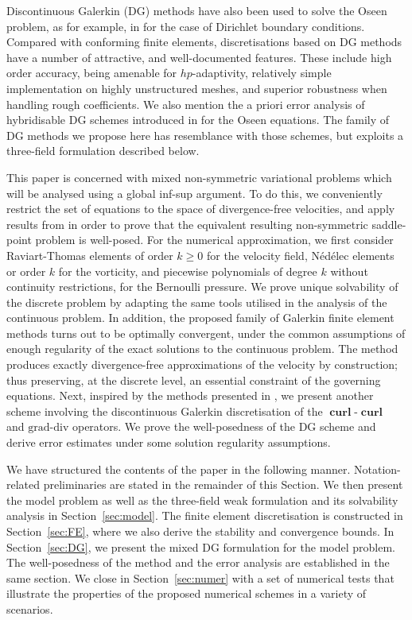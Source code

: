 \documentclass[reqno,a4paper]{article}
\numberwithin{equation}{section}
\newcommand\curl{\mathop{\mathbf{curl}}\nolimits}
\begin{document}
Discontinuous Galerkin (DG) methods have also been used to solve the Oseen problem,
as for example, in \cite{Cockburn03,Cockburn05}  for the case of Dirichlet boundary conditions. 
Compared with conforming finite elements, discretisations based on DG methods have a number of 
attractive, and well-documented features. These include  
 high order accuracy, being amenable for $hp$-adaptivity, relatively simple implementation on 
 highly unstructured meshes, and superior robustness when handling rough coefficients. 
We also mention the a priori error analysis of hybridisable DG schemes introduced  
in \cite{CockburnJSC13} for the Oseen equations. The family of DG methods we propose here 
has resemblance with those schemes, but exploits a three-field formulation described below. 


This paper is concerned with mixed non-symmetric variational problems 
which will be  analysed using a global inf-sup argument. 
To do this, we conveniently restrict the set of equations to the space of divergence-free velocities, and apply
results from \cite{G2014} in order to prove that the equivalent resulting non-symmetric saddle-point
problem is well-posed. For the numerical approximation, we first consider
Raviart-Thomas elements of order $k\ge0$ for the velocity field, N\'ed\'elec elements
or order $k$ for the vorticity, and piecewise polynomials of degree $k$ without 
continuity restrictions, for the Bernoulli pressure.
We prove unique solvability of the discrete problem by adapting the same tools utilised
in the analysis of the continuous problem. In addition, the proposed family of Galerkin 
finite element methods 
turns out to be optimally convergent, under the common 
assumptions of enough regularity of the exact solutions to the continuous 
 problem. The method produces exactly divergence-free approximations 
of the velocity by construction;  thus preserving, at the discrete level, an essential constraint of the governing
equations. Next, inspired by the methods presented in \cite{Cockburn_SIAM2002,Cockburn03}, we present another scheme involving the discontinuous Galerkin discretisation of the $\curl$-$\curl$ and $\mathrm{grad}$-$\mathrm{div}$ operators. We prove the well-posedness of the DG scheme and derive error estimates under some solution regularity assumptions.



We have structured the contents of the paper in the following manner. Notation-related preliminaries 
are stated in the remainder of this Section. We then present the model problem 
as well as the three-field weak formulation and its solvability analysis in Section~\ref{sec:model}. 
The finite element discretisation is constructed in Section~\ref{sec:FE}, where we also 
derive the stability and convergence bounds. In Section~\ref{sec:DG}, we present the mixed DG formulation for the model problem. The well-posedness of the method and the error analysis are established in the same section. We close in Section~\ref{sec:numer} with a set of numerical tests 
that illustrate the properties of the proposed numerical schemes in a variety of scenarios. 
\end{document}

